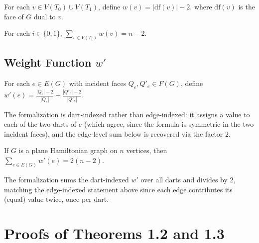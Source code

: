 \begin{definition}
  \label{def:weight_w}
  \notready
  For each $v \in V(T_0) \cup V(T_1)$, define $w(v) = |\mathrm{df}(v)| - 2$,
  where $\mathrm{df}(v)$ is the face of $G$ dual to $v$.
\end{definition}

\begin{proposition}
  \label{prop:weight_sum}
  \notready
  For each $i \in \{0, 1\}$,
  $\sum_{v \in V(T_i)} w(v) = n - 2$.
\end{proposition}

\section{Weight Function $w'$}

\begin{definition}
  \label{def:weight_wprime}
  \notready
  For each $e \in E(G)$ with incident faces $Q_e, Q'_e \in F(G)$, define
  $w'(e) = \frac{|Q_e| - 2}{|Q_e|} + \frac{|Q'_e| - 2}{|Q'_e|}$.

  The formalization is dart-indexed rather than edge-indexed: it assigns a
  value to each of the two darts of $e$ (which agree, since the formula is
  symmetric in the two incident faces), and the edge-level sum below is
  recovered via the factor $2$.
\end{definition}

\begin{corollary}[Sum of $w'$]
  \label{cor:wprime_sum}
  \notready
  If $G$ is a plane Hamiltonian graph on $n$ vertices, then
  $\sum_{e \in E(G)} w'(e) = 2(n - 2)$.

  The formalization sums the dart-indexed $w'$ over all darts and divides by
  $2$, matching the edge-indexed statement above since each edge contributes
  its (equal) value twice, once per dart.
\end{corollary}

\chapter{Proofs of Theorems 1.2 and 1.3}

